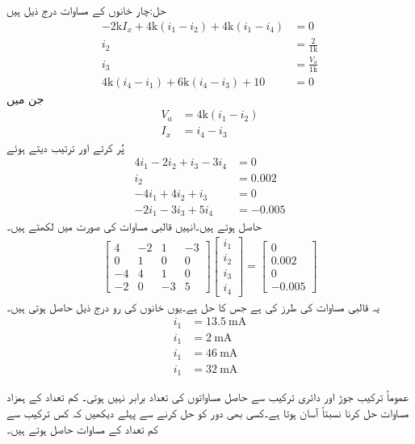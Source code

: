 حل:چار خانوں کے مساوات درج ذیل ہیں
\begin{align*}
-2\si{\kilo} I_x+4\si{\kilo}(i_1-i_2)+4\si{\kilo}(i_1-i_4)&=0\\
i_2&=\frac{2}{1\si{\kilo}}\\
i_3&=\frac{V_a}{1\si{\kilo}}\\
4\si{\kilo}(i_4-i_1)+6\si{\kilo}(i_4-i_3)+10&=0
\end{align*}
جن میں
\begin{align*}
V_a&=4\si{\kilo}(i_1-i_2)\\
I_x&=i_4-i_3
\end{align*}
پُر کرتے اور ترتیب  دیتے ہوئے
\begin{align*}
4i_1-2i_2+i_3-3i_4&=0\\
i_2&=0.002\\
-4i_1+4i_2+i_3&=0\\
-2i_1-3i_3+5i_4&=-0.005
\end{align*}
حاصل ہوتے ہیں۔انہیں قالبی مساوات کی صورت میں لکھتے ہیں۔
\begin{align*}
\begin{bmatrix*}
4 & -2 & 1 & -3\\
0& 1 & 0 & 0\\
-4 & 4 & 1 &0\\
-2&0&-3&5
\end{bmatrix*}
\begin{bmatrix}
i_1\\
i_2\\
i_3\\
i_4
\end{bmatrix}
=
\begin{bmatrix}
0\\
0.002\\
0\\
-0.005 
\end{bmatrix}
\end{align*}
یہ قالبی مساوات  کی طرز کی ہے جس کا حل  ہے۔یوں خانوں کی رو درج ذیل حاصل ہوتی ہیں۔
\begin{align*}
i_1&=\SI{13.5}{\milli\ampere}\\
i_1&=\SI{2}{\milli\ampere}\\
i_1&=\SI{46}{\milli\ampere}\\
i_1&=\SI{32}{\milli\ampere}
\end{align*}

عموماً ترکیب جوڑ اور دائری ترکیب سے حاصل مساواتوں کی تعداد برابر نہیں ہوتی۔ کم تعداد کے ہمزاد مساوات حل کرنا نسبتاً آسان ہوتا ہے۔کسی بھی دور کو حل کرنے سے پہلے دیکھیں کہ کس ترکیب سے کم تعداد کے مساوات حاصل ہوتے ہیں۔

